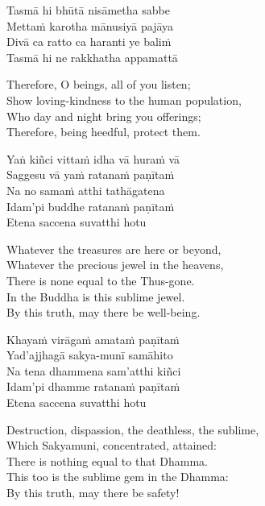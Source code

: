 \begin{pali-hang-continued}
  Tasmā hi bhūtā nisāmetha sabbe\\
  Mettaṁ karotha mānusiyā pajāya\\
  Divā ca ratto ca haranti ye baliṁ\\
  Tasmā hi ne rakkhatha appamattā
\end{pali-hang-continued}

\begin{english-verses}
  Therefore, O beings, all of you listen;\\
  Show loving-kindness to the human population,\\
  Who day and night bring you offerings;\\
  Therefore, being heedful, protect them.
\end{english-verses}

\begin{pali-hang-continued}
  Yaṅ kiñci vittaṁ idha vā huraṁ vā\\
  Saggesu vā yaṁ ratanaṁ paṇītaṁ\\
  Na no samaṁ atthi tathāgatena\\
  Idam'pi buddhe ratanaṁ paṇītaṁ\\
  Etena saccena suvatthi hotu
\end{pali-hang-continued}

\begin{english-verses}
  Whatever the treasures are here or beyond,\\
  Whatever the precious jewel in the heavens,\\
  There is none equal to the Thus-gone.\\
  In the Buddha is this sublime jewel.\\
  By this truth, may there be well-being.
\end{english-verses}

\begin{pali-hang-continued}
  Khayaṁ virāgaṁ amataṁ paṇītaṁ\\
  Yad'ajjhagā sakya-munī samāhito\\
  Na tena dhammena sam'atthi kiñci\\
  Idam'pi dhamme ratanaṁ paṇītaṁ\\
  Etena saccena suvatthi hotu
\end{pali-hang-continued}

\begin{english-verses}
  Destruction, dispassion, the deathless, the sublime,\\
  Which Sakyamuni, concentrated, attained:\\
  There is nothing equal to that Dhamma.\\
  This too is the sublime gem in the Dhamma:\\
  By this truth, may there be safety!
\end{english-verses}

